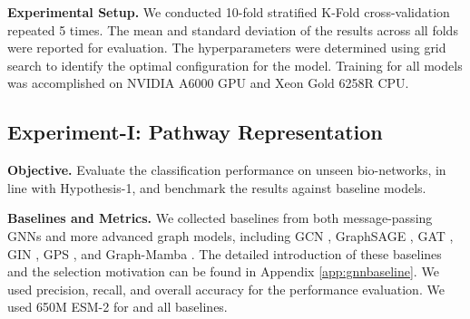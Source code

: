 
\noindent\textbf{Experimental Setup.} 
We conducted 10-fold stratified K-Fold cross-validation repeated 5 times. The mean and standard deviation of the results across all folds were reported for evaluation.
The hyperparameters were determined using grid search to identify the optimal configuration for the model.
Training for all models was accomplished on NVIDIA A6000 GPU and Xeon Gold 6258R CPU. 

\subsection{Experiment-I: Pathway Representation}
\label{subsec:exp1}

\textbf{Objective. }  Evaluate the classification performance on unseen bio-networks, in line with Hypothesis-1, and benchmark the results against baseline models.

\noindent\textbf{Baselines and Metrics.}
We collected baselines from both message-passing GNNs and more advanced graph models, including GCN \cite{GCN}, GraphSAGE \cite{GraphSAGE}, GAT \cite{GAT}, GIN \cite{GIN}, GPS \cite{GPS}, and Graph-Mamba \cite{Geraph-Mamba}.
The detailed introduction of these baselines and the selection motivation can be found in Appendix \ref{app:gnnbaseline}.
We used precision, recall, and overall accuracy for the performance evaluation. We used 650M ESM-2 for \classifier and all baselines.



